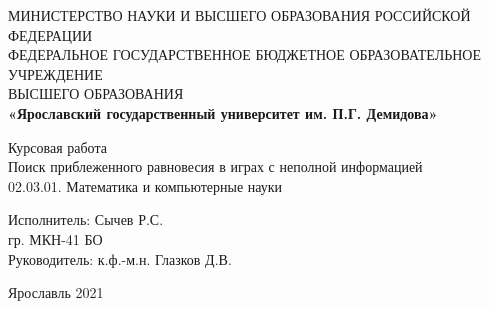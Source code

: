 \begin{center}
	\large{МИНИСТЕРСТВО НАУКИ И ВЫСШЕГО ОБРАЗОВАНИЯ РОССИЙСКОЙ ФЕДЕРАЦИИ}\\
	\footnotesize{ФЕДЕРАЛЬНОЕ ГОСУДАРСТВЕННОЕ БЮДЖЕТНОЕ ОБРАЗОВАТЕЛЬНОЕ УЧРЕЖДЕНИЕ}\\ 
	\footnotesize{ВЫСШЕГО ОБРАЗОВАНИЯ}\\
	\small{\textbf{«Ярославский государственный университет им. П.Г. Демидова»}}\\
	\hfill \break
	\hfill\break
	\hfill \break
	\hfill \break
	\hfill \break
	\hfill \break
	\hfill \break
	\hfill \break
	\hfill \break
	\hfill \break
	
	\normalsize{Курсовая работа}\\
	\large{Поиск приблеженного равновесия в играх с неполной информацией}\\	
	02.03.01. Математика и компьютерные науки\\
	
	\hfill \break
	\hfill \break
	\hfill \break
	\hfill \break
	\hfill \break
\end{center}

\normalsize{ 
	\begin{flushleft}
		\hspace*{80mm}Исполнитель: Сычев Р.С. \\
		\hspace*{80mm}гр. МКН-41 БО \\
		\hspace*{80mm}Руководитель: к.ф.-м.н. Глазков Д.В.
	\end{flushleft}
}
\hfill \break
\hfill \break
\hfill \break
\hfill \break
\hfill \break
\hfill \break
\begin{center} Ярославль 2021 \end{center}
\thispagestyle{empty} %

